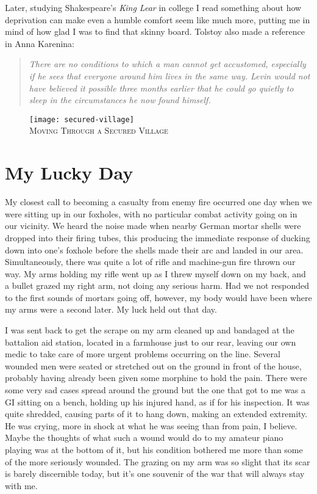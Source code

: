 \documentclass[../m3y]{subfiles}
\begin{document}
Later, studying Shakespeare's \emph{King Lear} in college I read something about how deprivation can make even a humble comfort seem like much more, putting me in mind of how glad I was to find that skinny board. Tolstoy also made a reference in Anna Karenina:

\begin{quote}
\emph{There are no conditions to which a man cannot get accustomed, especially if he sees that everyone around him lives in the same way. Levin would not have believed it possible three months earlier that he could go quietly to sleep in the circumstances he now found himself.}
\end{quote}

\begin{figure}[h]
\centering
\texttt{[image: secured-village]}\\
\medskip
{\newtimes\textsc{Moving Through a Secured Village}}
\end{figure}

\section{My Lucky Day}
My closest call to becoming a casualty from enemy fire occurred one day when we were sitting up in our foxholes, with no particular combat activity going on in our vicinity. We heard the noise made when nearby German mortar shells were dropped into their firing tubes, this producing the immediate response of ducking down into one's foxhole before the shells made their arc and landed in our area. Simultaneously, there was quite a lot of rifle and machine-gun fire thrown our way. My arms holding my rifle went up as I threw myself down on my back, and a bullet grazed my right arm, not doing any serious harm. Had we not responded to the first sounds of mortars going off, however, my body would have been where my arms were a second later. My luck held out that day.

I was sent back to get the scrape on my arm cleaned up and bandaged at the battalion aid station, located in a farmhouse just to our rear, leaving our own medic to take care of more urgent problems occurring on the line. Several wounded men were seated or stretched out on the ground in front of the house, probably having already been given some morphine to hold the pain. There were some very sad cases spread around the ground but the one that got to me was a GI sitting on a bench, holding up his injured hand, as if for his inspection. It was quite shredded, causing parts of it to hang down, making an extended extremity. He was crying, more in shock at what he was seeing than from pain, I believe. Maybe the thoughts of what such a wound would do to my amateur piano playing was at the bottom of it, but his condition bothered me more than some of the more seriously wounded. The grazing on my arm was so slight that its scar is barely discernible today, but it's one souvenir of the war that will always stay with me.
\end{document}
